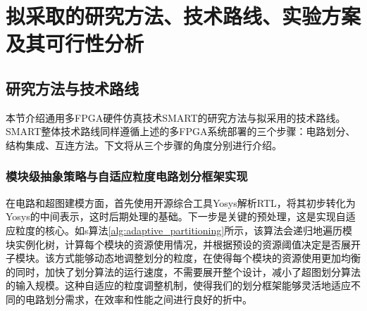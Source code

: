 \chapter{拟采取的研究方法、技术路线、实验方案及其可行性分析}

\section{研究方法与技术路线}

本节介绍通用多FPGA硬件仿真技术SMART的研究方法与拟采用的技术路线。SMART整体技术路线同样遵循上述的多FPGA系统部署的三个步骤：电路划分、结构集成、互连方法。下文将从三个步骤的角度分别进行介绍。

\subsection{模块级抽象策略与自适应粒度电路划分框架实现}

在电路和超图建模方面，首先使用开源综合工具Yosys解析RTL，将其初步转化为Yosys的中间表示，这时后期处理的基础。下一步是关键的预处理，这是实现自适应粒度的核心。如s算法\ref{alg:adaptive_partitioning}所示，该算法会递归地遍历模块实例化树，计算每个模块的资源使用情况，并根据预设的资源阈值决定是否展开子模块。该方式能够动态地调整划分的粒度，在使得每个模块的资源使用更加均衡的同时，加快了划分算法的运行速度，不需要展开整个设计，减小了超图划分算法的输入规模。这种自适应的粒度调整机制，使得我们的划分框架能够灵活地适应不同的电路划分需求，在效率和性能之间进行良好的折中。

